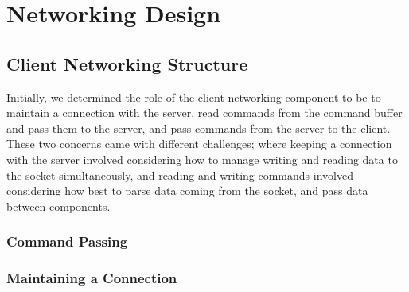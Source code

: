 \section{Networking Design}

\subsection{Client Networking Structure}

Initially, we determined the role of the client networking component to be to maintain a connection with the server, read commands from the command buffer and pass them to the server, and pass commands from the server to the client. These two concerns came with different challenges; where keeping a connection with the server involved considering how to manage writing and reading data to the socket simultaneously, and reading and writing commands involved considering how best to parse data coming from the socket, and pass data between components.

\subsubsection {Command Passing }


\subsubsection {Maintaining a Connection}
